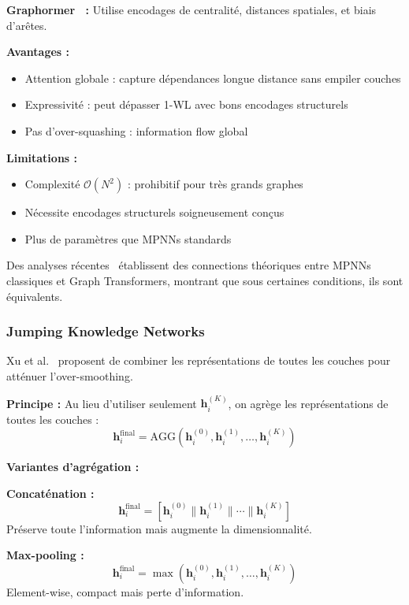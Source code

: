 \textbf{Graphormer~\cite{Ying2021} :}
Utilise encodages de centralité, distances spatiales, et biais d'arêtes.

\textbf{Avantages :}
\begin{itemize}
    \item Attention globale : capture dépendances longue distance sans empiler couches
    \item Expressivité : peut dépasser 1-WL avec bons encodages structurels
    \item Pas d'over-squashing : information flow global
\end{itemize}

\textbf{Limitations :}
\begin{itemize}
    \item Complexité $\mathcal{O}(N^2)$ : prohibitif pour très grands graphes
    \item Nécessite encodages structurels soigneusement conçus
    \item Plus de paramètres que MPNNs standards
\end{itemize}

Des analyses récentes~\cite{Cai2023} établissent des connections théoriques entre MPNNs classiques et Graph Transformers, montrant que sous certaines conditions, ils sont équivalents.

\subsubsection{Jumping Knowledge Networks}

Xu et al.~\cite{Xu2018} proposent de combiner les représentations de toutes les couches pour atténuer l'over-smoothing.

\textbf{Principe :}
Au lieu d'utiliser seulement $\mathbf{h}_i^{(K)}$, on agrège les représentations de toutes les couches :
\[
\mathbf{h}_i^{\text{final}} = \text{AGG}\left(\mathbf{h}_i^{(0)}, \mathbf{h}_i^{(1)}, \ldots, \mathbf{h}_i^{(K)}\right)
\]

\textbf{Variantes d'agrégation :}

\textbf{Concaténation :}
\[
\mathbf{h}_i^{\text{final}} = [\mathbf{h}_i^{(0)} \| \mathbf{h}_i^{(1)} \| \cdots \| \mathbf{h}_i^{(K)}]
\]
Préserve toute l'information mais augmente la dimensionnalité.

\textbf{Max-pooling :}
\[
\mathbf{h}_i^{\text{final}} = \max\left(\mathbf{h}_i^{(0)}, \mathbf{h}_i^{(1)}, \ldots, \mathbf{h}_i^{(K)}\right)
\]
Element-wise, compact mais perte d'information.

